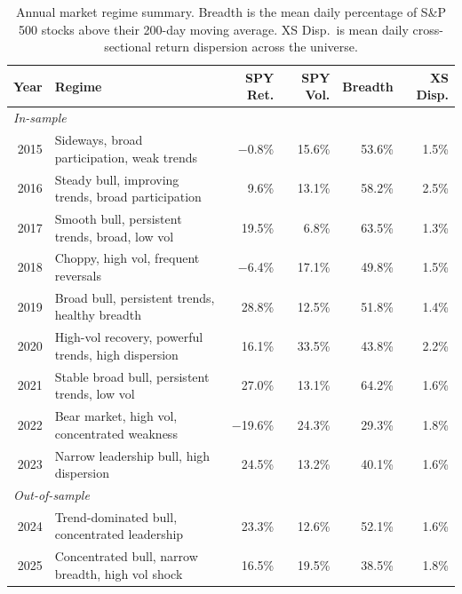 \begin{table}[htbp]
\centering
\small
\begin{tabular}{rp{5.5cm}rrrr}
\toprule
Year & Regime & SPY Ret. & SPY Vol. & Breadth & XS Disp. \\
\midrule
\multicolumn{6}{l}{\textit{In-sample}} \\
2015 & Sideways, broad participation, weak trends         &  $-$0.8\% & 15.6\% & 53.6\% & 1.5\% \\
2016 & Steady bull, improving trends, broad participation &    9.6\%  & 13.1\% & 58.2\% & 2.5\% \\
2017 & Smooth bull, persistent trends, broad, low vol     &   19.5\%  &  6.8\% & 63.5\% & 1.3\% \\
2018 & Choppy, high vol, frequent reversals               &  $-$6.4\% & 17.1\% & 49.8\% & 1.5\% \\
2019 & Broad bull, persistent trends, healthy breadth     &   28.8\%  & 12.5\% & 51.8\% & 1.4\% \\
2020 & High-vol recovery, powerful trends, high dispersion &  16.1\%  & 33.5\% & 43.8\% & 2.2\% \\
2021 & Stable broad bull, persistent trends, low vol      &   27.0\%  & 13.1\% & 64.2\% & 1.6\% \\
2022 & Bear market, high vol, concentrated weakness       & $-$19.6\% & 24.3\% & 29.3\% & 1.8\% \\
2023 & Narrow leadership bull, high dispersion            &   24.5\%  & 13.2\% & 40.1\% & 1.6\% \\
\midrule
\multicolumn{6}{l}{\textit{Out-of-sample}} \\
2024 & Trend-dominated bull, concentrated leadership      &   23.3\%  & 12.6\% & 52.1\% & 1.6\% \\
2025 & Concentrated bull, narrow breadth, high vol shock  &   16.5\%  & 19.5\% & 38.5\% & 1.8\% \\
\bottomrule
\end{tabular}
\caption{Annual market regime summary. Breadth is the mean daily percentage of S\&P 500
stocks above their 200-day moving average. XS Disp.\ is mean daily cross-sectional
return dispersion across the universe.}
\label{tab:regimes}
\end{table}
